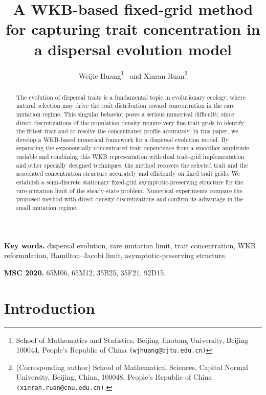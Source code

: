 \documentclass[11pt]{article}
\title{A WKB-based fixed-grid method for capturing trait concentration in a dispersal evolution model}
\author{
Weijie Huang\thanks{School of Mathematics and Statistics, Beijing Jiaotong University, Beijing 100044, People's Republic of China {\tt (wjhuang@bjtu.edu.cn)}} \ and
Xinran Ruan\thanks{(Corresponding author) School of Mathematical Sciences, Capital Normal University, Beijing, China, 100048, People's Republic of China {\tt (xinran.ruan@cnu.edu.cn)}.}
}
\begin{document}
\date{}
\maketitle

\begin{abstract}
The evolution of dispersal traits is a fundamental topic in evolutionary ecology, 
where natural selection may drive the trait distribution toward concentration in the rare mutation regime. 
This singular behavior poses a serious numerical difficulty, 
since direct discretizations of the population density require very fine trait grids to identify the fittest trait and to resolve the concentrated profile accurately. 
In this paper, we develop a WKB-based numerical framework for a dispersal evolution model. 
By separating the exponentially concentrated trait dependence from a smoother
amplitude variable and combining this WKB representation with dual trait-grid implementation and other specially designed techniques, the method recovers the selected trait and
the associated concentration structure accurately and efficiently on fixed trait grids. 
We establish a semi-discrete stationary fixed-grid asymptotic-preserving structure for the rare-mutation limit of the steady-state problem.
Numerical experiments compare the proposed method with
direct density discretizations and confirm its advantage in the small mutation
regime.
\end{abstract}

{\bf Key words. } dispersal evolution, rare mutation limit, trait concentration, WKB reformulation, Hamilton--Jacobi limit, asymptotic-preserving structure.

{\bf MSC 2020. } 65M06, 65M12, 35B25, 35F21, 92D15.


\section{Introduction}
\end{document}
